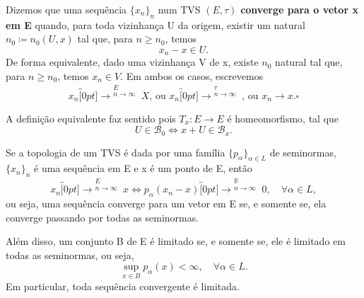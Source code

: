 \documentclass[../distribution_theory_notes.tex]{subfiles}
\begin{document}
   \begin{def*}
     Dizemos que uma sequência \(\{x_{n}\}_{n}\) num TVS \((E, \tau )\) \textbf{converge para o vetor x em E}  quando, para toda vizinhança U da origem, existir um natural \(n_{0}\coloneqq n_{0}(U, x)\) tal que, para \(n\geq n_{0}\), temos 
       \[
         x_{n}-x\in U.
       \]
       De forma equivalente, dado uma vizinhança V de x, existe \(n_{0}\) natural tal que, para \(n\geq n_{0}\), temos \(x_{n}\in V\). Em ambos os casos, escrevemos 
         \[
           x_{n}\overbracket[0pt]{\longrightarrow}^{\substack{E \\ n\rightarrow \infty}}X\text{, ou }x_{n}\overbracket[0pt]{\longrightarrow}^{\substack{\tau  \\ n\rightarrow \infty}}\text{, ou } x_{n}\rightarrow x.\square
         \]
   \end{def*}
   A definição equivalente faz sentido pois \(T_{x}:E\rightarrow E\) é homeomorfismo, tal que 
     \[
       U\in \mathcal{B}_{0} \Longleftrightarrow x+U\in \mathcal{B}_{x}.
     \]
    \begin{lemma*}
      Se a topologia de um TVS é dada por uma família \(\{p_{\alpha }\}_{\alpha \in L}\) de seminormas, \(\{x_{n}\}_{n}\) é uma sequência em E e x é um ponto de E, então 
        \[
        x_{n}\overbracket[0pt]{\longrightarrow}^{\substack{E \\ n\rightarrow \infty}}x \Longleftrightarrow p_{\alpha }(x_{n}-x)\overbracket[0pt]{\longrightarrow}^{\substack{\mathbb{R} \\ n\rightarrow \infty}}0,\quad \forall \alpha \in L,
        \]
        ou seja, uma sequência converge para um vetor em E se, e somente se, ela converge passando por todas as seminormas. 

        Além disso, um conjunto B de E é limitado se, e somente se, ele é limitado em todas as seminormas, ou seja, 
          \[
            \sup_{x\in B}p_{\alpha }(x)<\infty,\quad \forall \alpha \in L.
          \]
          Em particular, toda sequência convergente é limitada.
    \end{lemma*}
\end{document}
